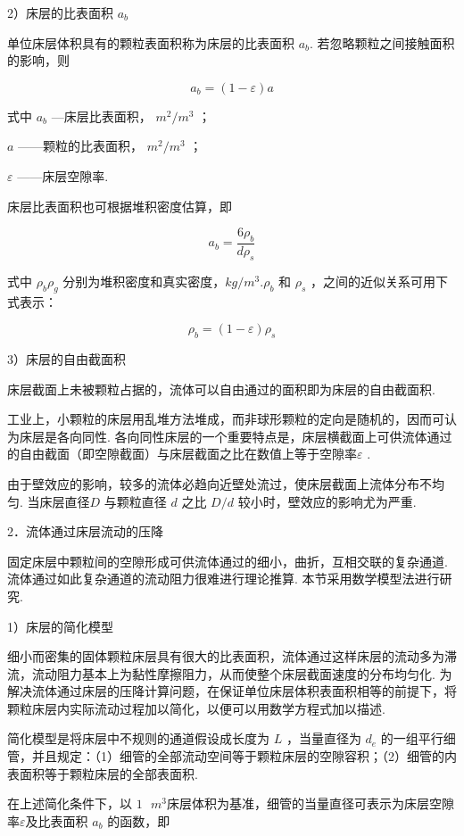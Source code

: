 \documentclass[
]{article}
\begin{document}
2）床层的比表面积 \(a_{b}\)

单位床层体积具有的颗粒表面积称为床层的比表面积 \(a_{b}\). 若忽略颗粒之间接触面积的影响，则

\[a_{b} = (1 - \varepsilon)a\]

式中 \(a_{b}\) ---床层比表面积， \(m^{2}/m^{3}\) ；

\(a\) ------颗粒的比表面积， \(m^{2}/m^{3}\) ；

\(\varepsilon\) ------床层空隙率. 

床层比表面积也可根据堆积密度估算，即

\[a_{b} = \frac{6\rho_{b}}{d\rho_{s}}\]

式中 \(\rho_{b}\rho_{g}\) 分别为堆积密度和真实密度，\(kg/m^{3}. \rho_{b}\) 和 \(\rho_{s}\) ，之间的近似关系可用下式表示：

\[\rho_{b} = (1 - \varepsilon)\rho_{s}\]

3）床层的自由截面积

床层截面上未被颗粒占据的，流体可以自由通过的面积即为床层的自由截面积. 

工业上，小颗粒的床层用乱堆方法堆成，而非球形颗粒的定向是随机的，因而可认为床层是各向同性. 各向同性床层的一个重要特点是，床层横截面上可供流体通过的自由截面（即空隙截面）与床层截面之比在数值上等于空隙率\(\varepsilon\) . 

由于壁效应的影响，较多的流体必趋向近壁处流过，使床层截面上流体分布不均匀. 当床层直径\(D\) 与颗粒直径 \(d\) 之比 \(D/d\) 较小时，壁效应的影响尤为严重. 

2．流体通过床层流动的压降

固定床层中颗粒间的空隙形成可供流体通过的细小，曲折，互相交联的复杂通道. 流体通过如此复杂通道的流动阻力很难进行理论推算. 本节采用数学模型法进行研究. 

1）床层的简化模型

细小而密集的固体颗粒床层具有很大的比表面积，流体通过这样床层的流动多为滞流，流动阻力基本上为黏性摩擦阻力，从而使整个床层截面速度的分布均匀化. 为解决流体通过床层的压降计算问题，在保证单位床层体积表面积相等的前提下，将颗粒床层内实际流动过程加以简化，以便可以用数学方程式加以描述. 

简化模型是将床层中不规则的通道假设成长度为 \(L\) ，当量直径为 \(d_{e}\)
的一组平行细管，并且规定：（1）细管的全部流动空间等于颗粒床层的空隙容积；（2）细管的内表面积等于颗粒床层的全部表面积. 

在上述简化条件下，以 \(1{\text{\ }m}^{3}\)床层体积为基准，细管的当量直径可表示为床层空隙率\(\varepsilon\)及比表面积 \(a_{b}\) 的函数，即
\end{document}
